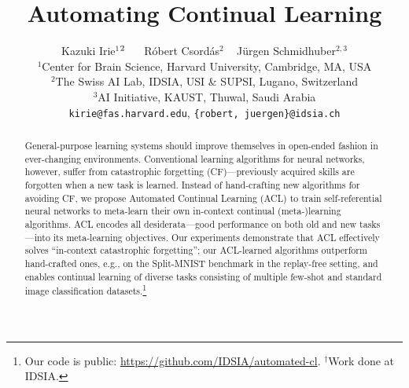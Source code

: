 \documentclass{article}
\title{Automating Continual Learning}
\author{Kazuki Irie$^{1}$$\footnotemark[2]$ ~~ R\'obert Csord\'as$^{2}$ ~ J\"urgen Schmidhuber$^{2,3}$\\
  $^1$Center for Brain Science, Harvard University, Cambridge, MA, USA \\
  $^2$The Swiss AI Lab, IDSIA, USI \& SUPSI, Lugano, Switzerland \\
  $^3$AI Initiative, KAUST, Thuwal, Saudi Arabia \\
  \texttt{kirie@fas.harvard.edu}, \texttt{\{robert, juergen\}@idsia.ch}
}
\begin{document}
\maketitle

\begin{abstract}
General-purpose learning systems should improve themselves in open-ended fashion in ever-changing environments. Conventional learning algorithms for neural networks, however, suffer from catastrophic forgetting (CF)---previously acquired skills are forgotten when a new task is learned. Instead of hand-crafting new algorithms for avoiding CF, we propose Automated Continual Learning (ACL) to train self-referential neural networks to meta-learn their own in-context continual \mbox{(meta-)learning} algorithms. ACL encodes all desiderata---good performance on both old and new tasks---into its meta-learning objectives.
Our experiments demonstrate that
ACL effectively solves ``in-context catastrophic forgetting''; our ACL-learned algorithms outperform hand-crafted ones, e.g., on the Split-MNIST benchmark in the replay-free setting, 
and enables continual learning of diverse tasks consisting of multiple few-shot and standard image classification datasets.\footnote{Our code is public: \url{https://github.com/IDSIA/automated-cl}.  $^\dagger$Work done at IDSIA.}
\end{abstract}
\end{document}

